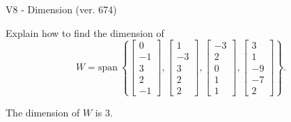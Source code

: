 \begin{exercise}
  \begin{exerciseTitle}V8 - Dimension (ver. 674)\end{exerciseTitle}
  \begin{exerciseStatement}
    Explain how to find the dimension of 
\[W=\mathrm{span}\ \left\{\left[\begin{array}{r}
0 \\
-1 \\
3 \\
2 \\
-1
\end{array}\right] , \left[\begin{array}{r}
1 \\
-3 \\
3 \\
2 \\
2
\end{array}\right] , \left[\begin{array}{r}
-3 \\
2 \\
0 \\
1 \\
1
\end{array}\right] , \left[\begin{array}{r}
3 \\
1 \\
-9 \\
-7 \\
2
\end{array}\right]\right\}.\]



  \end{exerciseStatement}
  \begin{exerciseAnswer}
   The dimension of \(W\) is  \(3\).
  


  \end{exerciseAnswer}
\end{exercise}